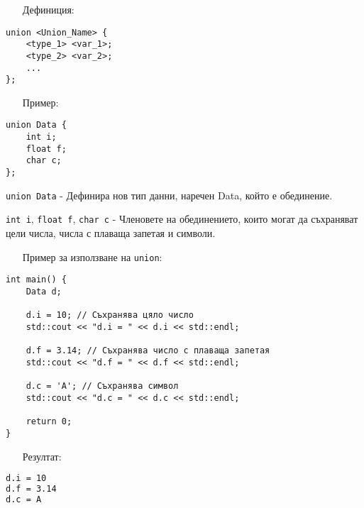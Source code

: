 \documentclass[oneside]{book}
\newcommand*{\code}[1]{\texttt{#1}}
\begin{document}
\begin{itemize}\item[Дефиниция:]\end{itemize}\vspace{-12pt}
\begin{mdframed}\begin{lstlisting}
union <Union_Name> {
    <type_1> <var_1>;
    <type_2> <var_2>;
    ...
};
\end{lstlisting}\end{mdframed}

\begin{itemize}\item[Пример:]\end{itemize}\vspace{-12pt}
\begin{mdframed}\begin{lstlisting}
union Data {
    int i;
    float f;
    char c;
};
\end{lstlisting}\end{mdframed}

\code{union Data} - Дефинира нов тип данни, наречен Data, който е обединение.

\code{int i}, \code{float f}, \code{char c} - Членовете на обединението, които могат да съхраняват цели числа, числа с плаваща запетая и символи.

\begin{itemize}\item[Пример] за използване на \code{union}:\end{itemize}
\begin{mdframed}\begin{lstlisting}
int main() {
    Data d;

    d.i = 10; // Съхранява цяло число
    std::cout << "d.i = " << d.i << std::endl;

    d.f = 3.14; // Съхранява число с плаваща запетая
    std::cout << "d.f = " << d.f << std::endl;

    d.c = 'A'; // Съхранява символ
    std::cout << "d.c = " << d.c << std::endl;

    return 0;
}
\end{lstlisting}\end{mdframed}

\begin{itemize}\item[Резултат:]\end{itemize}
\begin{mdframed}\begin{lstlisting}[language=bash]
d.i = 10
d.f = 3.14
d.c = A
\end{lstlisting}\end{mdframed}
\end{document}
